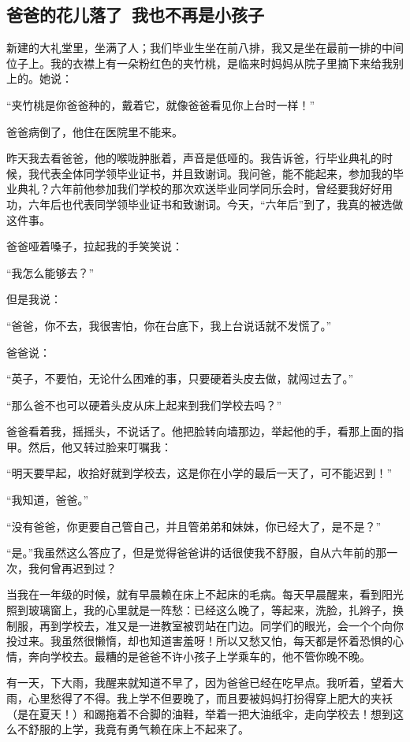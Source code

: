 \subsection{爸爸的花儿落了\ 我也不再是小孩子}


\par 新建的大礼堂里，坐满了人；我们毕业生坐在前八排，我又是坐在最前一排的中间位子上。我的衣襟上有一朵粉红色的夹竹桃，是临来时妈妈从院子里摘下来给我别上的。她说：
\par “夹竹桃是你爸爸种的，戴着它，就像爸爸看见你上台时一样！”
\par 爸爸病倒了，他住在医院里不能来。
\par 昨天我去看爸爸，他的喉咙肿胀着，声音是低哑的。我告诉爸，行毕业典礼的时候，我代表全体同学领毕业证书，并且致谢词。我问爸，能不能起来，参加我的毕业典礼？六年前他参加我们学校的那次欢送毕业同学同乐会时，曾经要我好好用功，六年后也代表同学领毕业证书和致谢词。今天，“六年后”到了，我真的被选做这件事。
\par 爸爸哑着嗓子，拉起我的手笑笑说：
\par “我怎么能够去？”
\par 但是我说：
\par “爸爸，你不去，我很害怕，你在台底下，我上台说话就不发慌了。”
\par 爸爸说：
\par “英子，不要怕，无论什么困难的事，只要硬着头皮去做，就闯过去了。”
\par “那么爸不也可以硬着头皮从床上起来到我们学校去吗？”
\par 爸爸看着我，摇摇头，不说话了。他把脸转向墙那边，举起他的手，看那上面的指甲。然后，他又转过脸来叮嘱我：
\par “明天要早起，收拾好就到学校去，这是你在小学的最后一天了，可不能迟到！”
\par “我知道，爸爸。”
\par “没有爸爸，你更要自己管自己，并且管弟弟和妹妹，你已经大了，是不是？”
\par “是。”我虽然这么答应了，但是觉得爸爸讲的话很使我不舒服，自从六年前的那一次，我何曾再迟到过？
\par 当我在一年级的时候，就有早晨赖在床上不起床的毛病。每天早晨醒来，看到阳光照到玻璃窗上，我的心里就是一阵愁：已经这么晚了，等起来，洗脸，扎辫子，换制服，再到学校去，准又是一进教室被罚站在门边。同学们的眼光，会一个个向你投过来。我虽然很懒惰，却也知道害羞呀！所以又愁又怕，每天都是怀着恐惧的心情，奔向学校去。最糟的是爸爸不许小孩子上学乘车的，他不管你晚不晚。
\par 有一天，下大雨，我醒来就知道不早了，因为爸爸已经在吃早点。我听着，望着大雨，心里愁得了不得。我上学不但要晚了，而且要被妈妈打扮得穿上肥大的夹袄（是在夏天！）和踢拖着不合脚的油鞋，举着一把大油纸伞，走向学校去！想到这么不舒服的上学，我竟有勇气赖在床上不起来了。
